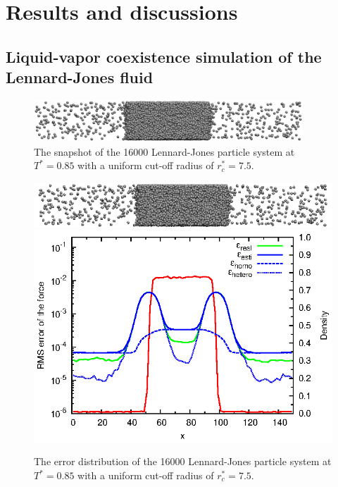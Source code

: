 \documentclass[aps,pre,preprint]{revtex4}
\begin{document}
\newpage




\section{Results and discussions}

\subsection{Liquid-vapor coexistence simulation of the Lennard-Jones fluid}

\begin{figure}
  \centering
  \includegraphics[width=0.9\textwidth]{fig/t0.85-n16000-rc07.5uni/confout.eps}
  \caption{The snapshot of the 16000 Lennard-Jones particle system at
    $T^\ast=0.85$ with a uniform cut-off radius of $r_c^\ast = 7.5$.}
  \label{fig:tmp1}
\end{figure}

\begin{figure}
  \centering
  \includegraphics[]{fig/t0.85-n16000-rc07.5uni/confout-02.eps}
  \includegraphics[]{fig/t0.85-n16000-rc07.5uni/error.uniform.eps}
  \caption{The error distribution of the 16000 Lennard-Jones particle
    system at $T^\ast=0.85$ with a uniform cut-off radius of $r_c^\ast
    = 7.5$.}
  \label{fig:tmp2}
\end{figure}
\end{document}
